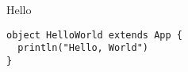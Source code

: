 \documentclass{beamer}
\begin{document}
\begin{frame}[fragile]{Hello}
\begin{verbatim}
object HelloWorld extends App {
  println("Hello, World")
}
\end{verbatim}
\end{frame}
\end{document}
